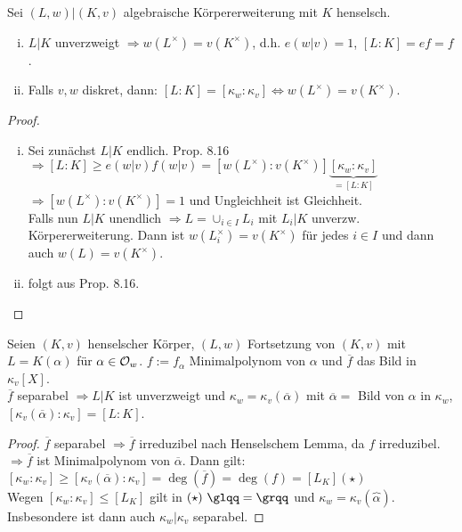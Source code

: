 \begin{Bem}
Sei $(L,w)|(K,v)$ algebraische Körpererweiterung mit $K$ henselsch.
\begin{enumerate}[i)]
\item $L|K$ unverzweigt $\Rightarrow w(L^\times)=v(K^\times)$, d.h. $e(w|v)=1$, $[L:K]=ef=f$.
\item Falls $v,w$ diskret, dann: $[L:K]=[\kappa_w : \kappa_v] \iff w(L^\times)=v(K^\times)$.
\end{enumerate}
\end{Bem}

\begin{proof}
\begin{enumerate}[i)]
\item Sei zunächst $L|K$ endlich. Prop. 8.16 $\Rightarrow [L:K] \geq e(w|v)f(w|v)=[w(L^\times):v(K^\times)] \underbrace{[\kappa_w:\kappa_v]}_{=[L:K]}$\\
$\Rightarrow [w(L^\times):v(K^\times)]=1$ und Ungleichheit ist Gleichheit.\\
Falls nun $L|K$ unendlich $\Rightarrow L=\cup_{i \in I} L_i$ mit $L_i|K$ unverzw. Körpererweiterung. Dann ist $w(L_i^\times)=v(K^\times)$ für jedes $i \in I$ und dann auch $w(L)=v(K^\times)$.
\item folgt aus Prop. 8.16.
\end{enumerate}
\end{proof}

\begin{Bsp}
Seien $(K,v)$ henselscher Körper, $(L,w)$ Fortsetzung von $(K,v)$ mit $L=K(\alpha)$ für $\alpha \in \mathcal{O}_w$. $f:=f_\alpha$ Minimalpolynom von $\alpha$ und $\overline{f}$ das Bild in $\kappa_v[X]$.\\
$\overline{f}$ separabel $\Rightarrow L|K$ ist unverzweigt und $\kappa_w=\kappa_v(\overline{\alpha})$ mit $\overline{\alpha}=$ Bild von $\alpha$ in $\kappa_w$, $[\kappa_v(\overline{\alpha}): \kappa_v]=[L:K]$.
\end{Bsp}

\begin{proof}
$\overline{f}$ separabel $\Rightarrow \overline{f}$ irreduzibel nach Henselschem Lemma, da $f$ irreduzibel. $\Rightarrow \overline{f}$ ist Minimalpolynom von $\overline{\alpha}$. Dann gilt:\\
$[\kappa_w:\kappa_v] \geq [\kappa_v(\overline{\alpha}):\kappa_v]=\deg(\overline{f})=\deg(f)=[L_K] (\star)$\\
Wegen $[\kappa_w:\kappa_v] \leq [L_K]$ gilt in $(\star)\ \glqq =\grqq$ und $\kappa_w=\kappa_v(\overbrace{\alpha})$. Insbesondere ist dann auch $\kappa_w|\kappa_v$ separabel.
\end{proof}

